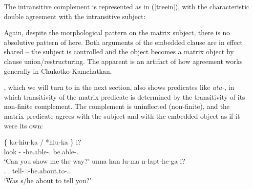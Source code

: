 \documentclass[output=paper]{langsci/langscibook}
\begin{document}
The intransitive complement is represented as in (\ref{treein}), with the
characteristic double agreement with the intransitive subject:\largerpage

\ea \label{treein}
\z

Again, despite the morphological pattern on the matrix subject, there is no
absolutive pattern of  here. Both arguments of the embedded clause are
in effect shared -- the subject is controlled and the object becomes a matrix
object by clause union/restructuring. The apparent  is an
artifact of how agreement works generally in Chukotko-Kamchatkan.

, which we will turn to in the next section, also shows predicates like
 \emph{utu-}, in which transitivity of the matrix predicate is
determined by the transitivity of its non-finite complement. The complement is
uninflected (non-finite), and the matrix predicate agrees with the subject and
with the embedded object as if it were its own:

\ea \label{belhi} \begin{xlista}
    \ex {} \{ ka-hiu-ka / *hiu-ka \}   i?\\
    {} look \Caus-\Sbjv{} {} {} \Fsg{}-be.able-\Second.\Su{} {} \hphantom{*}be.able-\Second.\Su{} {} \glossQ{} \\
	\glt `Can you show me the way?'
	\ex \gll  unna han lu-ma n-lapt-he-ga i?\\
	\Tsg.\Erg{} \Ssg.\Abs{} tell-\Inf{} \Third.\Aa{}-be.about.to-\Pst.\Second.\Su{} \glossQ{} \\
	\glt `Was s/he about to tell you?'
	\end{xlista}
\z
\end{document}
